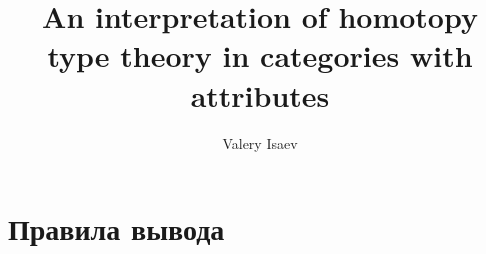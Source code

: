 \documentclass{amsart}
\theoremstyle{definition}
\theoremstyle{remark}
\newcommand{\red}{\Rightarrow}
\newcommand{\deq}{\Leftrightarrow}
\numberwithin{figure}{section}
\begin{document}
\title{An interpretation of homotopy type theory in categories with attributes}

\author{Valery Isaev}


\maketitle

\section{Правила вывода}

\begin{comment}
\begin{table}

\medskip
\begin{center}
\AxiomC{}
\UnaryInfC{$\vdash$}
\DisplayProof
\quad
\AxiomC{$\Gamma \vdash A$}
\RightLabel{, $x \notin \Gamma$}
\UnaryInfC{$\Gamma, x : A \vdash$}
\DisplayProof
\end{center}

\medskip
\begin{center}
\AxiomC{$\Gamma \vdash A$}
\RightLabel{, $x \notin \Gamma$}
\UnaryInfC{$\Gamma, x : A \vdash x : A$}
\DisplayProof
\quad
\AxiomC{$\Gamma \vdash x : A$}
\AxiomC{$\Gamma \vdash B$}
\RightLabel{, $y \notin \Gamma$}
\BinaryInfC{$\Gamma, y : B \vdash x : A$}
\DisplayProof
\end{center}

\medskip
\begin{center}
\AxiomC{$\Gamma \vdash a : A_1$}
\AxiomC{$\Gamma \vdash A_2$}
\RightLabel{, $A_1 \deq A_2$}
\BinaryInfC{$\Gamma \vdash a : A_2$}
\DisplayProof
\end{center}

\medskip
\begin{center}
\AxiomC{$\Gamma \vdash A \red B$}
\UnaryInfC{$\Gamma \vdash A \deq B$}
\DisplayProof
\quad
\AxiomC{$\Gamma \vdash A \deq B$}
\UnaryInfC{$\Gamma \vdash B \deq A$}
\DisplayProof
\end{center}

\medskip
\begin{center}
\AxiomC{$\Gamma \vdash A \deq B$}
\AxiomC{$\Gamma \vdash B \deq C$}
\BinaryInfC{$\Gamma \vdash A \deq C$}
\DisplayProof
\end{center}

\medskip
\begin{center}
\AxiomC{$\Gamma \vdash a \red a' : A$}
\UnaryInfC{$\Gamma \vdash a \deq a' : A$}
\DisplayProof
\quad
\AxiomC{$\Gamma \vdash a \deq a' : A$}
\UnaryInfC{$\Gamma \vdash a' \deq a : A$}
\DisplayProof
\end{center}


\end{comment}
\end{document}
